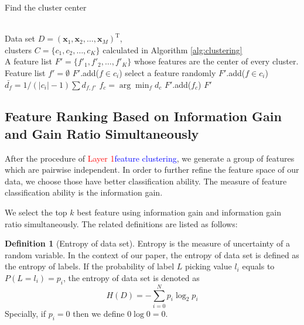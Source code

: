 \documentclass{ieeeaccess}
\theoremstyle{definition}
\newtheorem{defn}{Definition}
\newcommand{\change}[2]{\textcolor{red}{#1}\textcolor{blue}{#2}}
\begin{document}
\begin{algorithm}
\caption{Find the cluster center}
\label{alg:find-cluster-center}
\begin{algorithmic}[1]
\REQUIRE ~~\\
    Data set $D=(\bm{x}_1,\bm{x}_2,\ldots,\bm{x}_M)^\text{T}$, \\
    clusters $C=\{c_1, c_2, \ldots, c_K\}$ calculated in Algorithm \ref{alg:clustering}
\ENSURE ~~\\
    A feature list $F'=\{f'_1, f'_2, \ldots, f'_K\}$ whose features are the center of every cluster.
\STATE Feature list $f'=\emptyset$
        \STATE $F'$.add($f \in c_i$)
            \STATE select a feature randomly
            \STATE $F'$.add($f \in c_i$)
    \ELSE
            \STATE $\bar{d_f}=1/(|c_i|-1)\sum d_{f, f'}$
        \ENDFOR
        \STATE $f_c=\arg\min_f d_c$
        \STATE $F'$.add($f_c$)
    \ENDIF
\ENDFOR
\RETURN $F'$
\end{algorithmic}
\end{algorithm}

\subsection{Feature Ranking Based on Information Gain and Gain Ratio Simultaneously}

After the procedure of \change{Layer 1}{feature clustering}, we generate a group of features which are pairwise independent. In order to further refine the feature space of our data, we choose those have better classification ability. The measure of feature classification ability is the information gain.

We select the top $k$ best feature using information gain and information gain ratio simultaneously. The related definitions are listed as follows:

\begin{defn}[Entropy of data set]
    Entropy\cite{Shannon1948} is the measure of uncertainty of a random variable. In the context of our paper, the entropy of data set is defined as the entropy of labels. If the probability of label $L$ picking value $l_i$ equals to $P(L=l_i)=p_i$, the entropy of data set is denoted as
\begin{equation}
    H(D) = -\sum_{i=0}^N p_i \log_2 p_i
\end{equation}
Specially, if $p_i=0$ then we define $0\log0 = 0$.
\end{defn}
\end{document}
